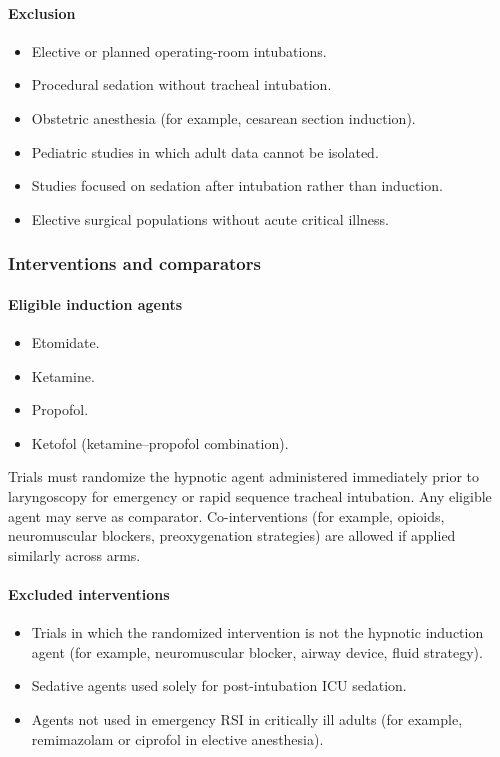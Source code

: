 \documentclass[11pt]{article}
\begin{document}
\paragraph{Exclusion}

\begin{itemize}
  \item Elective or planned operating-room intubations.
  \item Procedural sedation without tracheal intubation.
  \item Obstetric anesthesia (for example, cesarean section induction).
  \item Pediatric studies in which adult data cannot be isolated.
  \item Studies focused on sedation after intubation rather than induction.
  \item Elective surgical populations without acute critical illness.
\end{itemize}

\subsubsection{Interventions and comparators}

\paragraph{Eligible induction agents}

\begin{itemize}
  \item Etomidate.
  \item Ketamine.
  \item Propofol.
  \item Ketofol (ketamine--propofol combination).
\end{itemize}

Trials must randomize the hypnotic agent administered immediately prior to laryngoscopy for emergency or rapid sequence tracheal intubation. Any eligible agent may serve as comparator. Co-interventions (for example, opioids, neuromuscular blockers, preoxygenation strategies) are allowed if applied similarly across arms.

\paragraph{Excluded interventions}

\begin{itemize}
  \item Trials in which the randomized intervention is not the hypnotic induction agent (for example, neuromuscular blocker, airway device, fluid strategy).
  \item Sedative agents used solely for post-intubation ICU sedation.
  \item Agents not used in emergency RSI in critically ill adults (for example, remimazolam or ciprofol in elective anesthesia).
\end{itemize}
\end{document}
